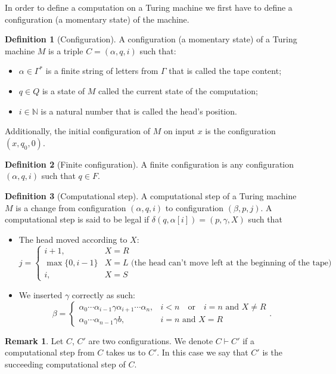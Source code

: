 \documentclass[11pt,a4paper]{article}
\theoremstyle{definition}
\newtheorem{definition}{Definition}[section]
\newtheorem{remark}{Remark}[section]
\theoremstyle{plain}
\newcommand{\N}{\mathbb{N}}
\newcommand{\tor}{\quad \text{or} \quad}
\begin{document}
  In order to define a computation on a Turing machine we first have
  to define a configuration (a momentary state) of the machine.

  \begin{definition}[Configuration]
    A configuration (a momentary state) of a Turing machine $M$ is
    a triple $C = (\alpha, q, i)$ such that:
    \begin{itemize}
      \item $\alpha \in \Gamma^*$ is a finite string of letters from $\Gamma$
        that is called the tape content;
      \item $q \in Q$ is a state of $M$ called the current state of the
        computation;
      \item $i \in \N$ is a natural number that is called the head's 
        position.
    \end{itemize}
    Additionally, the initial configuration of $M$ on input $x$ is
    the configuration $(x,q_0,0)$.
  \end{definition}

  \begin{definition}[Finite configuration]
    A finite configuration is any configuration $(\alpha,q,i)$ such that
    $q \in F$.
  \end{definition}
  
  \begin{definition}[Computational step]
    A computational step of a Turing machine $M$ is a change from
    configuration $(\alpha,q,i)$ to configuration $(\beta,p,j)$.
    A computational step is said to be legal if
    $\delta(q,\alpha[i]) = (p,\gamma,X)$ such that
    \begin{itemize}
      \item The head moved according to $X$:
        \[
          j =
          \begin{cases}
            i + 1, &X=R \\
            \max\{0,i-1\} &X=L \text{ 
            (the head can't move left at the beginning of the tape)} \\
            i, &X=S
          \end{cases}.
        \]
      \item We inserted $\gamma$ correctly as such:
        \[
          \beta =
          \begin{cases}
            \alpha_0 \cdots \alpha_{i-1} \gamma \alpha_{i+1} \cdots \alpha_n,
            &i < n \tor i = n \text{ and } X \neq R \\
            \alpha_0 \cdots \alpha_{n-1} \gamma b, &i = n \text{ and } X = R
          \end{cases}.
        \]
    \end{itemize}
  \end{definition}
  \begin{remark}
    Let $C$, $C'$ are two configurations.
    We denote $C \vdash C'$ if a computational step from $C$ takes us
    to $C'$.
    In this case we say that $C'$ is the succeeding computational step
    of $C$.
  \end{remark}
\end{document}
